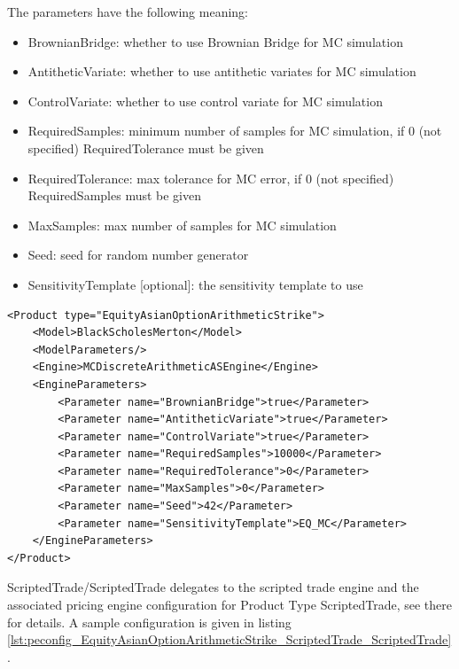 The parameters have the following meaning:

\begin{itemize}
\item BrownianBridge: whether to use Brownian Bridge for MC simulation
\item AntitheticVariate: whether to use antithetic variates for MC simulation
\item ControlVariate: whether to use control variate for MC simulation
\item RequiredSamples: minimum number of samples for MC simulation, if 0 (not specified) RequiredTolerance must be given
\item RequiredTolerance: max tolerance for MC error, if 0 (not specified) RequiredSamples must be given
\item MaxSamples: max number of samples for MC simulation
\item Seed: seed for random number generator
\item SensitivityTemplate [optional]: the sensitivity template to use
\end{itemize}

\begin{longlisting}
\begin{verbatim}
<Product type="EquityAsianOptionArithmeticStrike">
    <Model>BlackScholesMerton</Model>
    <ModelParameters/>
    <Engine>MCDiscreteArithmeticASEngine</Engine>
    <EngineParameters>
        <Parameter name="BrownianBridge">true</Parameter>
        <Parameter name="AntitheticVariate">true</Parameter>
        <Parameter name="ControlVariate">true</Parameter>
        <Parameter name="RequiredSamples">10000</Parameter>
        <Parameter name="RequiredTolerance">0</Parameter>
        <Parameter name="MaxSamples">0</Parameter>
        <Parameter name="Seed">42</Parameter>
        <Parameter name="SensitivityTemplate">EQ_MC</Parameter>
    </EngineParameters>
</Product>
\end{verbatim}
\caption{Configuration for Product EquityAsianOptionArithmeticStrike, Model BlackScholesMerton, Engine MCDiscreteArithmeticASEngine}
\label{lst:peconfig_EquityAsianOptionArithmeticStrike_BlackScholesMerton_MCDiscreteArithmeticASEngine}
\end{longlisting}

ScriptedTrade/ScriptedTrade delegates to the scripted trade engine and the associated pricing engine configuration for
Product Type ScriptedTrade, see there for details. A sample configuration is given in listing
\ref{lst:peconfig_EquityAsianOptionArithmeticStrike_ScriptedTrade_ScriptedTrade}.

